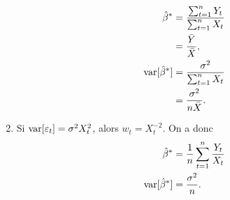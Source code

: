 \begin{solution}{3.15}
\begin{enumerate}
\begin{align*}
        \hat{\beta}^*
        &= \frac{\sum_{t=1}^n Y_t}{\sum_{t=1}^n X_t} \\
        &= \frac{\bar{Y}}{\bar{X}}, \\
        \mathrm{var} [ \hat{\beta}^* ]
        &= \frac{\sigma^2}{\sum_{t=1}^n X_t} \\
        &= \frac{\sigma^2}{n \bar{X}}.
      \end{align*}
    \item Si $\mathrm{var} [ \varepsilon_t ] = \sigma^2 X_t^2$, alors $w_t =
      X_t^{-2}$. On a donc
      \begin{align*}
        \hat{\beta}^*
        &= \frac{1}{n} \sum_{t=1}^n \frac{Y_t}{X_t} \\
        \mathrm{var} [ \hat{\beta}^* ]
        &= \frac{\sigma^2}{n}.
      \end{align*}
    \end{enumerate}
  
\end{solution}
